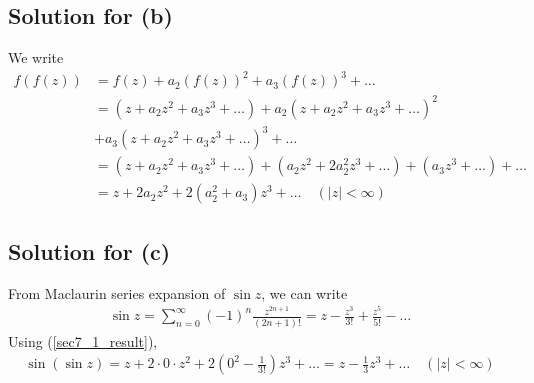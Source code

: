 \documentclass{scrartcl}
\begin{document}
\subsection{Solution for (b)}
We write
\begin{align*}
  f(f(z)) &= f(z) + a_2 (f(z))^2 + a_3 (f(z))^3 + \dots \\
          &= (z + a_2 z^2 + a_3 z^3 + \dots) + a_2 (z + a_2 z^2 + a_3 z^3 + \dots)^2 \\
          &+ a_3 (z + a_2 z^2 + a_3 z^3 + \dots)^3 + \dots \\
          &= (z + a_2 z^2 + a_3 z^3 + \dots) + (a_2 z^2 + 2a_2^2 z^3 + \dots) + (a_3 z^3 + \dots) + \dots \\
          &= z + 2a_2 z^2 + 2(a_2^2 + a_3) z^3 + \dots \quad (|z| < \infty)
\end{align*}

\subsection{Solution for (c)}
From Maclaurin series expansion of \(\sin z\), we can write
\begin{align*}
  \sin z = \sum^\infty_{n = 0} (-1)^n \frac{z^{2n + 1}}{(2n + 1)!} = z - \frac{z^3}{3!} + \frac{z^5}{5!} - \dots
\end{align*}
Using (\ref{sec7_1_result}),
\begin{align*}
  \sin (\sin z) = z + 2 \cdot 0 \cdot z^2 + 2 \left( 0^2 - \frac{1}{3!} \right) z^3 + \dots = z - \frac{1}{3} z^3 + \dots \quad (|z| < \infty)
\end{align*}
\end{document}
